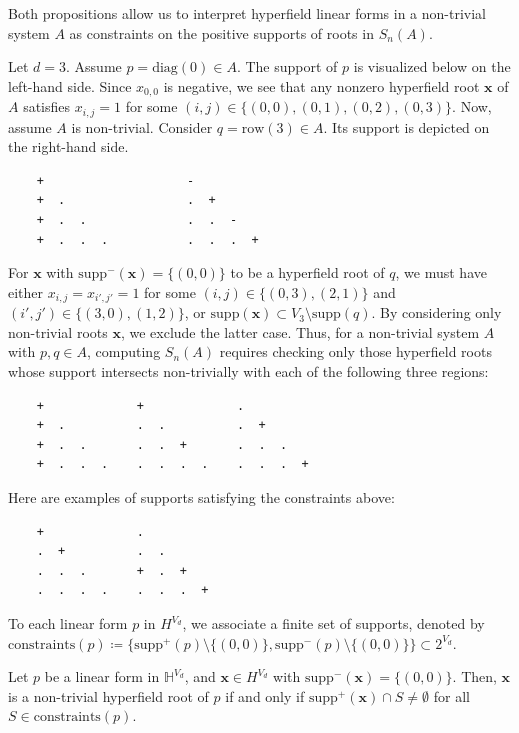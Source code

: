Both propositions allow us to interpret hyperfield linear forms in a non-trivial system $A$ as constraints on the positive supports of roots in $S_{n}(A)$.


\begin{example}
Let $d = 3$. Assume $p = \mathrm{diag}(0) \in A$. The support of $p$ is visualized below on the left-hand side. Since $x_{0,0}$ is negative, we see that any nonzero hyperfield root $\mathbf{x}$ of $A$ satisfies $x_{i,j} = 1$ for some \( (i,j) \in \{ (0,0), (0,1), (0,2), (0,3) \} \). Now, assume $A$ is non-trivial. Consider $q = \mathrm{row}(3) \in A$. Its support is depicted on the right-hand side.
\begin{verbatim}
    +                    - 
    +  .                 .  + 
    +  .  .              .  .  -
    +  .  .  .           .  .  .  +
\end{verbatim} 
For $\mathbf{x}$ with $\mathrm{supp}^-(\mathbf{x}) = \{ (0,0) \}$ to be a hyperfield root of $q$, we must have either $x_{i,j} = x_{i',j'} = 1$ for some $(i,j) \in \{ (0,3), (2, 1) \}$ and $(i',j') \in \{ (3,0), (1,2) \}$, or $\mathrm{supp}(\mathbf{x}) \subset V_{3} \setminus \mathrm{supp}(q)$.
By considering only non-trivial roots \( \mathbf{x} \), we exclude the latter case. Thus, for a non-trivial system \( A \) with \( p, q \in A \), computing \( S_{n}(A) \) requires checking only those hyperfield roots whose support intersects non-trivially with each of the following three regions:
\begin{verbatim}
    +             +             .
    +  .          .  .          .  + 
    +  .  .       .  .  +       .  .  .
    +  .  .  .    .  .  .  .    .  .  .  + 
\end{verbatim}
Here are examples of supports satisfying the constraints above:
\begin{verbatim}
    +             .        
    .  +          .  .      
    .  .  .       +  .  +
    .  .  .  .    .  .  .  +
\end{verbatim}
\end{example}

\begin{definition}
To each linear form $p$ in \( H^{V_d} \), we associate a finite set of supports, denoted by $\mathrm{constraints}(p) \coloneqq \{\mathrm{supp}^+(p) \setminus \{(0,0)\}, \mathrm{supp}^-(p) \setminus \{ (0,0) \} \}  \subset 2^{V_{d}}$. 
\end{definition}

\begin{proposition}\label{prop:hyperfield_criterion:constraints}
Let $p$ be a linear form in \( \mathbb{H}^{V_d} \), and $\mathbf{x} \in H^{V_{d}}$ with $\mathrm{supp}^-(\mathbf{x}) = \{ (0,0) \}$. Then, $\mathbf{x}$ is a non-trivial hyperfield root of $p$ if and only if $\mathrm{supp}^+(\mathbf{x}) \cap S \neq \emptyset$ for all $S \in \mathrm{constraints}(p)$. 
\end{proposition}

